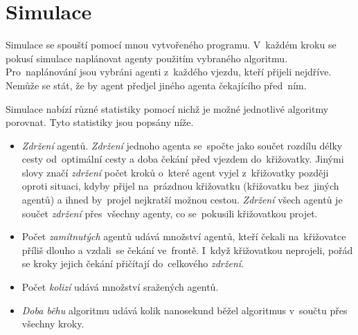 \section{Simulace}\label{sec:simulace}

Simulace se spouští pomocí mnou vytvořeného programu.
V~každém kroku se pokusí simulace naplánovat agenty použitím vybraného algoritmu.
Pro~naplánování jsou vybráni agenti z~každého vjezdu, kteří přijeli nejdříve.
Nemůže se stát, že by agent předjel jiného agenta čekajícího před~ním.

Simulace nabízí různé statistiky pomocí nichž je možné jednotlivé algoritmy porovnat.
Tyto statistiky jsou popsány níže.

\begin{itemize}
	\item \emph{Zdržení} agentů. \emph{Zdržení} jednoho agenta se~spočte jako součet
	rozdílu délky cesty od~optimální cesty a doba čekání před vjezdem do~křižovatky.
	Jinými slovy značí \emph{zdržení} počet kroků o~které agent vyjel z~křižovatky později oproti situaci,
	kdyby přijel na~prázdnou křižovatku (křižovatku bez~jiných agentů) a ihned by~projel nejkratší možnou cestou.
	\emph{Zdržení} všech agentů je součet \emph{zdržení} přes~všechny agenty, co se~pokusili křižovatkou projet.
	\item Počet \emph{zamítnutých} agentů udává množství agentů, kteří čekali na~křižovatce příliš dlouho a
	vzdali~se čekání ve~frontě.
	I~když křižovatkou neprojeli, pořád se kroky jejich čekání přičítají do~celkového \emph{zdržení}.
	\item Počet \emph{kolizí} udává množství sražených agentů.
	\item \emph{Doba běhu} algoritmu udává kolik nanosekund běžel algoritmus v~součtu přes všechny kroky.
\end{itemize}

